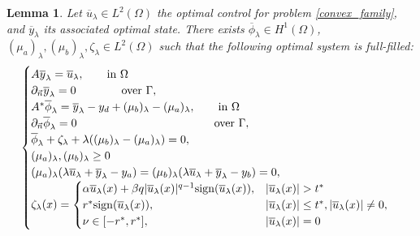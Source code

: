 \documentclass[11pt,a4paper]{amsart}
\newcommand{\sign}{\mathrm{sign}}
\newtheorem{lemma}{{Lemma}}
\begin{document}
\begin{lemma}
    Let $\overline{u}_{\lambda}\in L^{2}(\Omega)$ the optimal control for problem \eqref{convex_family}, and $\overline{y}_{\lambda}$ its associated optimal state. There exists $\overline{\phi}_{\lambda}\in H^1(\Omega)$, $(\mu_a)_{\lambda}, (\mu_b)_{\lambda}, \zeta_{\lambda}\in L^2(\Omega)$ such that the following optimal system is full-filled:    \begin{equation}\label{optimality_convex}
        \begin{cases}         
        A\overline{y}_{\lambda}=\overline{u}_{\lambda}, \qquad \mbox{in }\Omega\\
        \partial_{\vec{n}}\overline{y}_{\lambda}=0\qquad\qquad \mbox{over }\Gamma,\\
        A^*\overline{\phi}_{\lambda}=\overline{y}_{\lambda}-y_d+(\mu_b)_{\lambda}-(\mu_a)_{\lambda}, \qquad \mbox{in }\Omega\\
        \partial_{\vec{n}}\overline{\phi}_{\lambda}=0\hspace{4.25cm}\mbox{over }\Gamma,\\        \overline{\phi}_{\lambda}+\zeta_{\lambda}+\lambda((\mu_b)_{\lambda}-(\mu_a)_{\lambda})=0,\\
        (\mu_a)_{\lambda}, (\mu_b)_{\lambda}\ge 0\\
        (\mu_a)_{\lambda}(\lambda \overline{u}_{\lambda}+\overline{y}_{\lambda}-y_a)=(\mu_b)_{\lambda}(\lambda \overline{u}_{\lambda}+\overline{y}_{\lambda}-y_b)=0,\\
        \zeta_{\lambda}(x)=\begin{cases}
            \alpha \overline{u}_{\lambda}(x)+\beta q |\overline{u}_{\lambda}(x)|^{q-1}\sign(\overline{u}_{\lambda}(x)), &|\overline{u}_{\lambda}(x)|>t^*\\
            r^*\sign(\overline{u}_{\lambda}(x)), &|\overline{u}_{\lambda}(x)|\le t^*, |\overline{u}_{\lambda}(x)|\ne 0,\\
            \nu \in [-r^*,r^*],& |\overline{u}_{\lambda}(x)|=0
        \end{cases}  
        \end{cases}
    \end{equation}    
\end{lemma}
\end{document}
